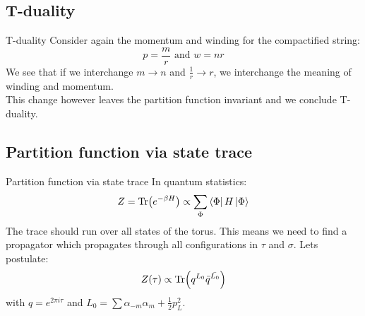 \documentclass[11pt,aspectratio=169]{beamer}
\begin{document}
\subsection{T-duality}

\begin{frame}{T-duality}
	Consider again the momentum and winding for the compactified string:
	\begin{equation}
		p = \frac{m}{r} \textrm{ and } w = nr
	\end{equation}
	We see that if we interchange $m \rightarrow n$ and $\frac{1}{r} \rightarrow r$, we interchange the meaning of winding and momentum. 
	\\
	This change however leaves the partition function invariant and we conclude T-duality.
\end{frame}




\subsection{Partition function via state trace}

\begin{frame}{Partition function via state trace}
	In quantum statistics:
	\begin{equation}
		Z = \Tr(e^{-\beta H}) \propto \sum_{\Phi}\bra{\Phi} H \ket{\Phi}
	\end{equation}
	The trace should run over all states of the torus. This means we need to find a propagator 
	which propagates through all configurations in $\tau$ and $\sigma$.
	Lets postulate:
	\begin{equation}
		Z(\tau) \propto \Tr(q^{L_0}\bar{q}^{\bar{L_0}})
	\end{equation} 
	with $q = e^{2\pi i \tau}$ and $L_0 = \sum \alpha_{-m}\alpha_m + \frac{1}{2}p_L^2$.
	

\end{frame}
\end{document}
